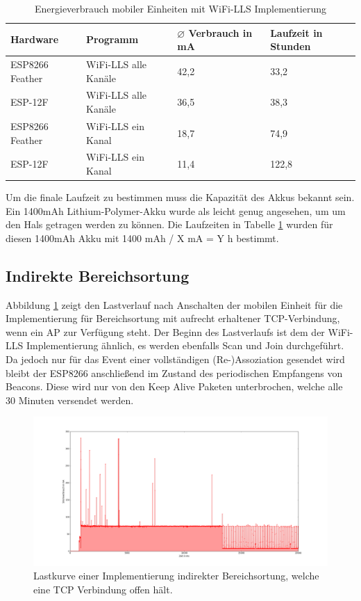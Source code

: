 \begin{table}[h!]
	\centering
	\caption{Energieverbrauch mobiler Einheiten mit WiFi-LLS Implementierung}
	\label{table:wifillsina}
	\begin{tabular}{p{3.5cm}|p{5cm}|p{2.5cm}|p{2.5cm}}
		Hardware & Programm & $\varnothing$ Verbrauch in mA & Laufzeit in Stunden\\
		\hline
		ESP8266 Feather & WiFi-LLS alle Kanäle & 42,2 & 33,2\\
		ESP-12F & WiFi-LLS alle Kanäle & 36,5 & 38,3\\
		ESP8266 Feather & WiFi-LLS ein Kanal & 18,7 & 74,9\\
		ESP-12F & WiFi-LLS ein Kanal & 11,4 & 122,8\\
	\end{tabular}
\end{table}

Um die finale Laufzeit zu bestimmen muss die Kapazität des Akkus bekannt sein.
Ein 1400mAh Lithium-Polymer-Akku wurde als leicht genug angesehen, um um den Hals getragen werden zu können.
Die Laufzeiten in Tabelle \ref{table:wifillsina} wurden für diesen 1400mAh Akku mit 1400 mAh / X mA = Y h bestimmt.



\subsection{Indirekte Bereichsortung}
\label{ch:phase1:sec:powerindirekt}
Abbildung \ref{fig:tcphold} zeigt den Lastverlauf nach Anschalten der mobilen Einheit für die Implementierung für Bereichsortung mit aufrecht erhaltener TCP-Verbindung, wenn ein AP zur Verfügung steht. 
Der Beginn des Lastverlaufs ist dem der WiFi-LLS Implementierung ähnlich, es werden ebenfalls Scan und Join durchgeführt.
Da jedoch nur für das Event einer vollständigen (Re-)Assoziation gesendet wird bleibt der ESP8266 anschließend im Zustand des periodischen Empfangens von Beacons.
Diese wird nur von den Keep Alive Paketen unterbrochen, welche alle 30 Minuten versendet werden.\\

\begin{figure}[h!]
  \centering
	\includegraphics[width=\textwidth]{plots/tcphold.png}
  \caption{Lastkurve einer Implementierung indirekter Bereichsortung, welche eine TCP Verbindung offen hält.}
  \label{fig:tcphold}
\end{figure}

